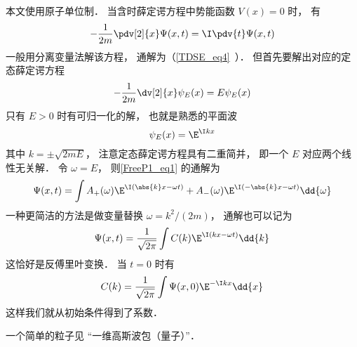 
\begin{issues}
\issueDraft
\end{issues}


本文使用原子单位制． 当含时薛定谔方程中势能函数 $V(x) = 0$ 时， 有
\begin{equation}\label{FreeP1_eq1}
-\frac{1}{2m}\pdv[2]{x}\Psi(x,t) = \I \pdv{t} \Psi(x,t)
\end{equation}
一般用分离变量法解该方程， 通解为（\autoref{TDSE_eq4}~）． 但首先要解出对应的定态薛定谔方程
\begin{equation}
-\frac{1}{2m}\dv[2]{x}\psi_E(x) = E \psi_E(x)
\end{equation}
只有 $E > 0$ 时有可归一化的解， 也就是熟悉的平面波
\begin{equation}
\psi_E(x) = \E^{\I k x}
\end{equation}
其中 $k = \pm\sqrt{2mE}$， 注意定态薛定谔方程具有二重简并， 即一个 $E$ 对应两个线性无关解． 令 $\omega = E$， 则\autoref{FreeP1_eq1} 的通解为
\begin{equation}
\Psi(x,t) = \int A_+(\omega) \E^{\I (\abs{k}x - \omega t)} + A_-(\omega) \E^{\I (-\abs{k}x - \omega t)} \dd{\omega}
\end{equation}
一种更简洁的方法是做变量替换 $\omega = k^2/(2m)$， 通解也可以记为
\begin{equation}
\Psi(x,t) = \frac{1}{\sqrt{2\pi}} \int C(k) \E^{\I (k x - \omega t)} \dd{k}
\end{equation}
这恰好是反傅里叶变换． 当 $t = 0$ 时有
\begin{equation}
C(k) = \frac{1}{\sqrt{2\pi}} \int \Psi(x,0) \E^{-\I k x} \dd{x}
\end{equation}
这样我们就从初始条件得到了系数．

一个简单的粒子见 “一维高斯波包（量子）”．
